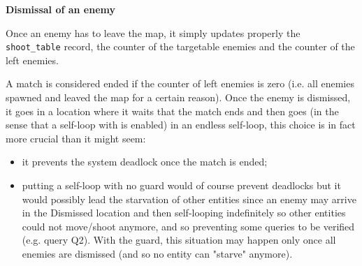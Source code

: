 \documentclass[
10pt, %
a4paper, %
oneside, %
headinclude,footinclude, %
BCOR5mm, %
]{scrartcl}
\begin{document}
				\begin{flushleft}
					\textbf{Dismissal of an enemy}
					
					Once an enemy has to leave the map, it simply updates properly the \texttt{shoot\_table} record, the counter of the targetable enemies and the counter of the left enemies.
					
					A match is considered ended if the counter of left enemies is zero (i.e. all enemies spawned and leaved the map for a certain reason). Once the enemy is dismissed, it goes in a location where it waits that the match ends and then goes (in the sense that a self-loop with is enabled) in an endless self-loop, this choice is in fact more crucial than it might seem:
					\begin{itemize}
						\item it prevents the system deadlock once the match is ended;
						\item putting a self-loop with no guard would of course prevent deadlocks but it would possibly lead the starvation of other entities since an enemy may arrive in the Dismissed location and then self-looping indefinitely so other entities could not move/shoot anymore, and so preventing some queries to be verified (e.g. query Q2). With the guard, this situation may happen only once all enemies are dismissed (and so no entity can "starve" anymore).
					\end{itemize}
				\end{flushleft}
\end{document}
